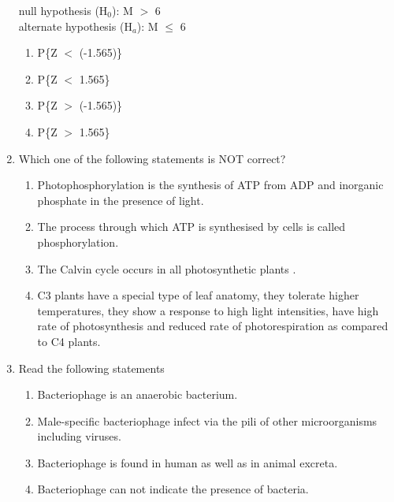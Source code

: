\documentclass[journal,12pt,onecolumn]{IEEEtran}
\theoremstyle{remark}
\begin{document}
\begin{enumerate}
\begin{center}
null hypothesis (H$_0$): \quad M $>$ 6 \\
alternate hypothesis (H$_a$): \quad M $\leq$ 6
\end{center}

\begin{enumerate}
\item P\{Z $<$ (-1.565)\}
\item P\{Z $<$ 1.565\}
\item P\{Z $>$ (-1.565)\}
\item P\{Z $>$ 1.565\}
\end{enumerate}
\hfill{}
\item Which one of the following statements is NOT correct?
\begin{enumerate}
\item Photophosphorylation is the synthesis of ATP from ADP and inorganic phosphate in the presence of light.
\item The process through which ATP is synthesised by cells  is called phosphorylation.
\item The Calvin cycle  occurs in all photosynthetic plants .
\item C3 plants have a special type of leaf anatomy, they tolerate higher temperatures, they show a response to high light intensities, have high rate of photosynthesis and reduced rate of photorespiration as compared to C4 plants.
\end{enumerate}
\hfill{}

\newpage

\item Read the following statements
\begin{enumerate}[label=\Roman*.]
\item Bacteriophage is an anaerobic bacterium.
\item Male-specific bacteriophage infect via the pili of other microorganisms including viruses.
\item Bacteriophage is found in human as well as in animal excreta.
\item Bacteriophage can not indicate the presence of bacteria.
\end{enumerate}


\end{enumerate}
\end{document}

